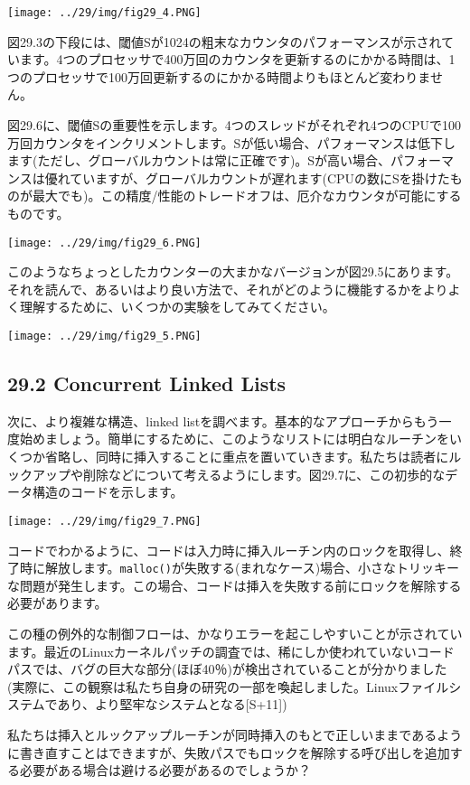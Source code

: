 \texttt{[image: ../29/img/fig29\_4.PNG]}

図29.3の下段には、閾値Sが1024の粗末なカウンタのパフォーマンスが示されています。4つのプロセッサで400万回のカウンタを更新するのにかかる時間は、1つのプロセッサで100万回更新するのにかかる時間よりもほとんど変わりません。

図29.6に、閾値Sの重要性を示します。4つのスレッドがそれぞれ4つのCPUで100万回カウンタをインクリメントします。Sが低い場合、パフォーマンスは低下します(ただし、グローバルカウントは常に正確です)。Sが高い場合、パフォーマンスは優れていますが、グローバルカウントが遅れます(CPUの数にSを掛けたものが最大でも)。この精度/性能のトレードオフは、厄介なカウンタが可能にするものです。

\texttt{[image: ../29/img/fig29\_6.PNG]}

このようなちょっとしたカウンターの大まかなバージョンが図29.5にあります。それを読んで、あるいはより良い方法で、それがどのように機能するかをよりよく理解するために、いくつかの実験をしてみてください。

\texttt{[image: ../29/img/fig29\_5.PNG]}

\hypertarget{concurrent-linked-lists}{%
\subsection*{29.2 Concurrent Linked
Lists}\label{concurrent-linked-lists}}

次に、より複雑な構造、linked
listを調べます。基本的なアプローチからもう一度始めましょう。簡単にするために、このようなリストには明白なルーチンをいくつか省略し、同時に挿入することに重点を置いていきます。私たちは読者にルックアップや削除などについて考えるようにします。図29.7に、この初歩的なデータ構造のコードを示します。

\texttt{[image: ../29/img/fig29\_7.PNG]}

コードでわかるように、コードは入力時に挿入ルーチン内のロックを取得し、終了時に解放します。\texttt{malloc()}が失敗する(まれなケース)場合、小さなトリッキーな問題が発生します。この場合、コードは挿入を失敗する前にロックを解除する必要があります。

この種の例外的な制御フローは、かなりエラーを起こしやすいことが示されています。最近のLinuxカーネルパッチの調査では、稀にしか使われていないコードパスでは、バグの巨大な部分(ほぼ40％)が検出されていることが分かりました(実際に、この観察は私たち自身の研究の一部を喚起しました。Linuxファイルシステムであり、より堅牢なシステムとなる{[}S+11{]})

私たちは挿入とルックアップルーチンが同時挿入のもとで正しいままであるように書き直すことはできますが、失敗パスでもロックを解除する呼び出しを追加する必要がある場合は避ける必要があるのでしょうか？

